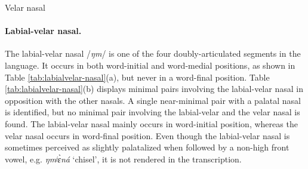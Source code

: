 \begin{table}[!htb] \small
\centering
\caption{Velar nasal\label{tab:velar-nasal}}

\quad
{}

\end{table}


\clearpage

\paragraph{Labial-velar nasal.}


The labial-velar nasal /{\it ŋm}/ is one of the four doubly-articulated 
segments in 
the language. It occurs in both word-initial and word-medial positions, as shown 
in Table \ref{tab:labialvelar-nasal}(a),  but  never in a word-final position. 
Table \ref{tab:labialvelar-nasal}(b) displays  minimal pairs involving the 
labial-velar nasal  in opposition with the other nasals. A single near-minimal 
pair with a palatal nasal is identified, but no minimal pair involving the 
labial-velar and the velar  nasal is found. The labial-velar nasal   mainly 
occurs in word-initial position, whereas the velar nasal occurs  in word-final 
position.  Even though the labial-velar nasal is sometimes perceived as slightly 
palatalized when followed by a non-high front vowel, e.g. {\it ŋmʲɛ̀ná} 
`chisel', it is not rendered in the transcription.



